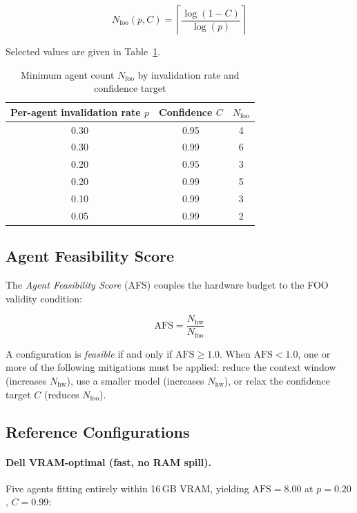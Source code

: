 \begin{equation}
N_{\text{foo}}(p, C)
  = \left\lceil \frac{\log(1 - C)}{\log(p)} \right\rceil
\label{eq:nfoo}
\end{equation}

Selected values are given in Table~\ref{tab:nfoo}.

\begin{table}[h]
\centering
\caption{Minimum agent count $N_{\text{foo}}$ by invalidation rate and
confidence target}
\label{tab:nfoo}
\begin{tabular}{ccc}
\toprule
Per-agent invalidation rate $p$ & Confidence $C$ & $N_{\text{foo}}$ \\
\midrule
0.30 & 0.95 & 4 \\
0.30 & 0.99 & 6 \\
0.20 & 0.95 & 3 \\
0.20 & 0.99 & 5 \\
0.10 & 0.99 & 3 \\
0.05 & 0.99 & 2 \\
\bottomrule
\end{tabular}
\end{table}

\subsection{Agent Feasibility Score}

The \emph{Agent Feasibility Score} (AFS) couples the hardware budget to
the FOO validity condition:

\begin{equation}
\text{AFS} = \frac{N_{\text{hw}}}{N_{\text{foo}}}
\label{eq:afs}
\end{equation}

A configuration is \emph{feasible} if and only if $\text{AFS} \geq 1.0$.
When $\text{AFS} < 1.0$, one or more of the following mitigations must
be applied: reduce the context window (increases $N_{\text{hw}}$), use a
smaller model (increases $N_{\text{hw}}$), or relax the confidence target
$C$ (reduces $N_{\text{foo}}$).

\subsection{Reference Configurations}

\paragraph{Dell VRAM-optimal (fast, no RAM spill).}
Five agents fitting entirely within 16\,GB VRAM, yielding
$\text{AFS} = 8.00$ at $p = 0.20$, $C = 0.99$:


